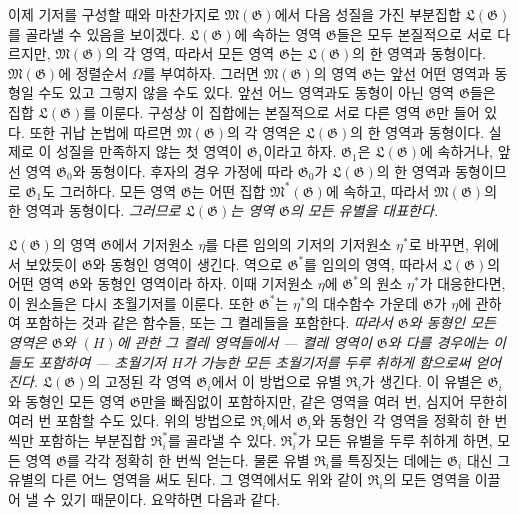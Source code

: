 이제 기저를 구성할 때와 마찬가지로 $\mathfrak M(\mathfrak G)$에서 다음 성질을 가진 부분집합 $\mathfrak L(\mathfrak G)$를 골라낼 수 있음을 보이겠다. $\mathfrak L(\mathfrak G)$에 속하는 영역 $\mathfrak G$들은 모두 본질적으로 서로 다르지만, $\mathfrak M(\mathfrak G)$의 각 영역, 따라서 모든 영역 $\mathfrak G$는 $\mathfrak L(\mathfrak G)$의 한 영역과 동형이다. $\mathfrak M(\mathfrak G)$에 정렬순서 $\Omega$를 부여하자. 그러면 $\mathfrak M(\mathfrak G)$의 영역 $\mathfrak G$는 앞선 어떤 영역과 동형일 수도 있고 그렇지 않을 수도 있다. 앞선 어느 영역과도 동형이 아닌 영역 $\mathfrak G$들은 집합 $\mathfrak L(\mathfrak G)$를 이룬다. 구성상 이 집합에는 본질적으로 서로 다른 영역 $\mathfrak G$만 들어 있다. 또한 귀납 논법에 따르면 $\mathfrak M(\mathfrak G)$의 각 영역은 $\mathfrak L(\mathfrak G)$의 한 영역과 동형이다. 실제로 이 성질을 만족하지 않는 첫 영역이 $\mathfrak G_1$이라고 하자. $\mathfrak G_1$은 $\mathfrak L(\mathfrak G)$에 속하거나, 앞선 영역 $\mathfrak G_0$와 동형이다. 후자의 경우 가정에 따라 $\mathfrak G_0$가 $\mathfrak L(\mathfrak G)$의 한 영역과 동형이므로 $\mathfrak G_1$도 그러하다. 모든 영역 $\mathfrak G$는 어떤 집합 $\mathfrak M^*(\mathfrak G)$에 속하고, 따라서 $\mathfrak M(\mathfrak G)$의 한 영역과 동형이다. \emph{그러므로 $\mathfrak L(\mathfrak G)$는 영역 $\mathfrak G$의 모든 유별을 대표한다.}

$\mathfrak L(\mathfrak G)$의 영역 $\mathfrak G$에서 기저원소 $\eta$를 다른 임의의 기저의 기저원소 $\eta^*$로 바꾸면, 위에서 보았듯이 $\mathfrak G$와 동형인 영역이 생긴다. 역으로 $\mathfrak G^*$를 임의의 영역, 따라서 $\mathfrak L(\mathfrak G)$의 어떤 영역 $\mathfrak G$와 동형인 영역이라 하자. 이때 기저원소 $\eta$에 $\mathfrak G^*$의 원소 $\eta^*$가 대응한다면, 이 원소들은 다시 초월기저를 이룬다. 또한 $\mathfrak G^*$는 $\eta^*$의 대수함수 가운데 $\mathfrak G$가 $\eta$에 관하여 포함하는 것과 같은 함수들, 또는 그 켤레들을 포함한다. \emph{따라서 $\mathfrak G$와 동형인 모든 영역은 $\mathfrak G$와 $(H)$에 관한 그 켤레 영역들에서} \emph{--- 켤레 영역이 $\mathfrak G$와 다를 경우에는 이들도 포함하여 --- 초월기저 $H$가 가능한 모든 초월기저를 두루 취하게 함으로써 얻어진다.} $\mathfrak L(\mathfrak G)$의 고정된 각 영역 $\mathfrak G_i$에서 이 방법으로 유별 $\mathfrak R_i$가 생긴다. 이 유별은 $\mathfrak G_i$와 동형인 모든 영역 $\mathfrak G$만을 빠짐없이 포함하지만, 같은 영역을 여러 번, 심지어 무한히 여러 번 포함할 수도 있다. 위의 방법으로 $\mathfrak R_i$에서 $\mathfrak G_i$와 동형인 각 영역을 정확히 한 번씩만 포함하는 부분집합 $\mathfrak R_i^*$를 골라낼 수 있다. $\mathfrak R_i^*$가 모든 유별을 두루 취하게 하면, 모든 영역 $\mathfrak G$를 각각 정확히 한 번씩 얻는다. 물론 유별 $\mathfrak R_i$를 특징짓는 데에는 $\mathfrak G_i$ 대신 그 유별의 다른 어느 영역을 써도 된다. 그 영역에서도 위와 같이 $\mathfrak R_i$의 모든 영역을 이끌어 낼 수 있기 때문이다. 요약하면 다음과 같다.


